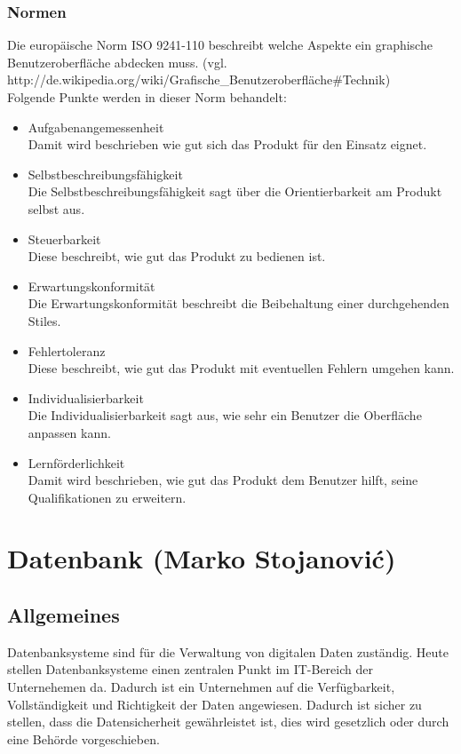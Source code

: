 \documentclass[12pt,a4paper]{report}
\begin{document}
\begin{onehalfspace}
\subsection{Normen}
Die europäische Norm ISO 9241-110 beschreibt welche Aspekte ein graphische Benutzeroberfläche abdecken muss. (vgl. http://de.wikipedia.org/wiki/Grafische\_Benutzeroberfläche\#Technik)\\
Folgende Punkte werden in dieser Norm behandelt:
\begin{itemize}
\item Aufgabenangemessenheit\\
Damit wird beschrieben wie gut sich das Produkt für den Einsatz eignet. 
\item Selbstbeschreibungsfähigkeit\\
Die Selbstbeschreibungsfähigkeit sagt über die Orientierbarkeit am Produkt selbst aus. 
\item Steuerbarkeit\\
Diese beschreibt, wie gut das Produkt zu bedienen ist. 
\item Erwartungskonformität\\
Die Erwartungskonformität beschreibt die Beibehaltung einer durchgehenden Stiles.
\item Fehlertoleranz\\
Diese beschreibt, wie gut das Produkt mit eventuellen Fehlern umgehen kann.
\item Individualisierbarkeit\\
Die Individualisierbarkeit sagt aus, wie sehr ein Benutzer die Oberfläche anpassen kann. 
\item Lernförderlichkeit\\
Damit wird beschrieben, wie gut das Produkt dem Benutzer hilft, seine Qualifikationen zu erweitern. 
\end{itemize}

\chapter{Datenbank (Marko Stojanovi\'{c})}

\section{Allgemeines}
Datenbanksysteme sind für die Verwaltung von digitalen Daten zuständig. Heute stellen Datenbanksysteme einen zentralen Punkt im IT-Bereich der Unternehemen da. Dadurch ist ein Unternehmen auf die Verfügbarkeit, Vollständigkeit und Richtigkeit der Daten angewiesen. Dadurch ist sicher zu stellen, dass die Datensicherheit gewährleistet ist, dies wird gesetzlich oder durch eine Behörde vorgeschieben.\\


\end{onehalfspace}
\end{document}
